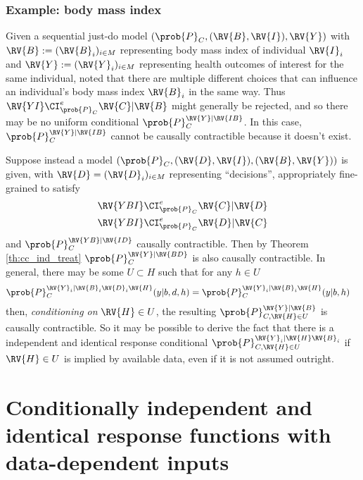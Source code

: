 \subsubsection{Example: body mass index}

Given a sequential just-do model $(\prob{P}_C,(\RV{B},\RV{I}),\RV{Y})$ with $\RV{B}:=(\RV{B}_i)_{i\in M}$ representing body mass index of individual $\RV{I}_i$ and $\RV{Y}:=(\RV{Y}_i)_{i\in M}$ representing health outcomes of interest for the same individual, \citet{hernan_does_2008} noted that there are multiple different choices that can influence an individual's body mass index $\RV{B}_i$ in the same way. Thus $\RV{YI}\CI^e_{\prob{P}_C} \RV{C}|\RV{B}$ might generally be rejected, and so there may be no uniform conditional $\prob{P}_C^{\RV{Y}|\RV{IB}}$. In this case, $\prob{P}_C^{\RV{Y}|\RV{IB}}$ cannot be causally contractible because it doesn't exist.

Suppose instead a model $(\prob{P}_C,(\RV{D},\RV{I}),(\RV{B},\RV{Y}))$ is given, with $\RV{D}=(\RV{D}_i)_{i\in M}$ representing ``decisions'', appropriately fine-grained to satisfy
\begin{align}
    &\RV{YBI}\CI^e_{\prob{P}_C} \RV{C}|\RV{D}\\
    &\RV{YBI}\CI^e_{\prob{P}_C} \RV{D}|\RV{C}
\end{align}
and $\prob{P}_C^{\RV{YB}|\RV{ID}}$ causally contractible. Then by Theorem \ref{th:cc_ind_treat} $\prob{P}_C^{\RV{Y}|\RV{BD}}$ is also causally contractible. In general, there may be some $U\subset H$ such that for any $h\in U$ 
\begin{align}
    \prob{P}_C^{\RV{Y}_i|\RV{B}_i\RV{D}_i\RV{H}}(y|b,d,h) &= \prob{P}_C^{\RV{Y}_i|\RV{B}_i\RV{H}}(y|b,h)\label{eq:conditional_conditional_independence}
\end{align}
then, \emph{conditioning on }$\RV{H}\in U$, the resulting $\prob{P}_{C,\RV{H}\in U}^{\RV{Y}|\RV{B}}$ is causally contractible.
So it may be possible to derive the fact that there is a independent and identical response conditional $\prob{P}_{C,\RV{H}\in U}^{\RV{Y}_i|\RV{H}\RV{B}_i}$ if $\RV{H}\in U$ is implied by available data, even if it is not assumed outright.

\section[Data-dependent inputs]{Conditionally independent and identical response functions with data-dependent inputs}\label{sec:data_dependent}

